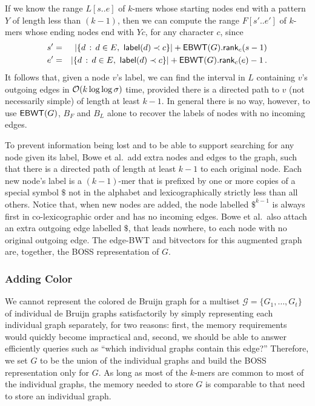 If we know the range \(L [s..e]\) of $k$-mers whose starting nodes end with a pattern $Y$ of length less than \((k - 1)\), then we can compute the range \(F [s'..e']\) of $k$-mers whose ending nodes end with \(Y c\), for any character $c$, since
\begin{eqnarray*}
s' & = & |\{d\,:\,d \in E,\ \mathsf{label} (d) \prec c\}| + \mathsf{EBWT} (G).\textsf{rank}_c (s - 1)\\
e' & = & |\{d\,:\,d \in E,\ \mathsf{label} (d) \prec c\}| + \mathsf{EBWT} (G).\textsf{rank}_c (e) - 1\,.
\end{eqnarray*}
It follows that, given a node $v$'s label, we can find the interval in $L$ containing $v$'s outgoing edges in $\mathcal{O}\!\left({k \log \log \sigma}\right)$ time, provided there is a directed path to $v$ (not necessarily simple) of length at least \(k - 1\).  In general there is no way, however, to use \(\mathsf{EBWT} (G)\), $B_F$ and $B_L$ alone to recover the labels of nodes with no incoming edges.

To prevent information being lost and to be able to support searching for any node given its label, Bowe et al.\ add extra nodes and edges to the graph, such that there is a directed path of length at least \(k - 1\) to each original node.  Each new node's label is a \((k - 1)\)-mer that is prefixed by one or more copies of a special symbol $\$$ not in the alphabet and lexicographically strictly less than all others.  Notice that, when new nodes are added, the node labelled $\$^{k - 1}$ is always first in co-lexicographic order and has no incoming edges.  Bowe et al.\ also attach an extra outgoing edge labelled $\$$, that leads nowhere, to each node with no original outgoing edge.  The edge-BWT and bitvectors for this augmented graph are, together, the BOSS representation of $G$.

\subsubsection{Adding Color}
\label{subsec:color}

We cannot represent the colored de Bruijn graph for a multiset \(\mathcal{G} = \{G_1, \ldots, G_t\}\) of individual de Bruijn graphs satisfactorily by simply representing each individual graph separately, for two reasons: first, the memory requirements would quickly become impractical and, second, we should be able to answer efficiently queries such as ``which individual graphs contain this edge?''  Therefore, we set $G$ to be the union of the individual graphs and build the BOSS representation only for $G$.  As long as most of the $k$-mers are common to most of the individual graphs, the memory needed to store $G$ is comparable to that need to store an individual graph.

